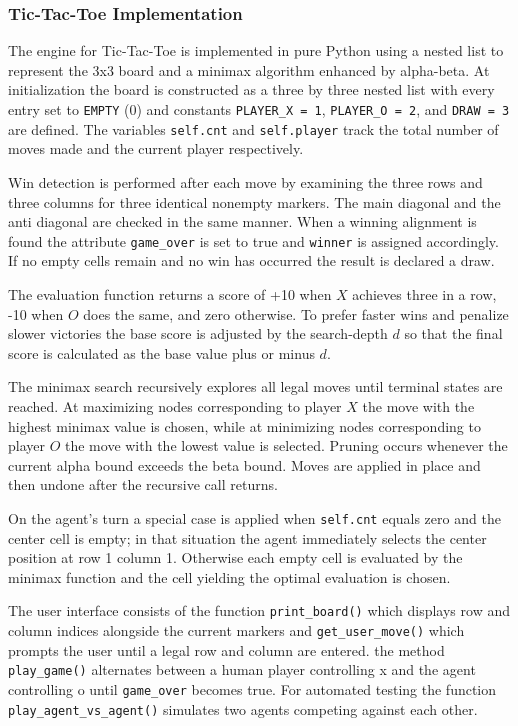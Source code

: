 \documentclass[12pt]{article}
\begin{document}
\subsubsection{Tic-Tac-Toe Implementation}

The engine for Tic-Tac-Toe is implemented in pure Python using a nested list to represent the 3x3 board and a minimax algorithm enhanced by \gls{alpha-beta}. At initialization the board is constructed as a three by three nested list with every entry set to \texttt{EMPTY} (0) and constants \texttt{PLAYER\_X = 1}, \texttt{PLAYER\_O = 2}, and \texttt{DRAW = 3} are defined. The variables \texttt{self.cnt} and \texttt{self.player} track the total number of moves made and the current player respectively.

Win detection is performed after each move by examining the three rows and three columns for three identical nonempty markers. The main diagonal and the anti diagonal are checked in the same manner. When a winning alignment is found the attribute \texttt{game\_over} is set to true and \texttt{winner} is assigned accordingly. If no empty cells remain and no win has occurred the result is declared a draw.

The evaluation function returns a score of +10 when $X$ achieves three in a row, -10 when $O$ does the same, and zero otherwise. To prefer faster wins and penalize slower victories the base score is adjusted by the \gls{search-depth} \(d\) so that the final score is calculated as the base value plus or minus \(d\).

The minimax search recursively explores all legal moves until terminal states are reached. At maximizing nodes corresponding to player $X$ the move with the highest minimax value is chosen, while at minimizing nodes corresponding to player $O$ the move with the lowest value is selected. Pruning occurs whenever the current alpha bound exceeds the beta bound. Moves are applied in place and then undone after the recursive call returns.

On the agent’s turn a special case is applied when \texttt{self.cnt} equals zero and the center cell is empty; in that situation the agent immediately selects the center position at row 1 column 1. Otherwise each empty cell is evaluated by the minimax function and the cell yielding the optimal evaluation is chosen.

The user interface consists of the function \texttt{print\_board()} which displays row and column indices alongside the current markers and \texttt{get\_user\_move()} which prompts the user until a legal row and column are entered. the method \texttt{play\_game()} alternates between a human player controlling x and the agent controlling o until \texttt{game\_over} becomes true. For automated testing the function \texttt{play\_agent\_vs\_agent()} simulates two agents competing against each other.
\end{document}
